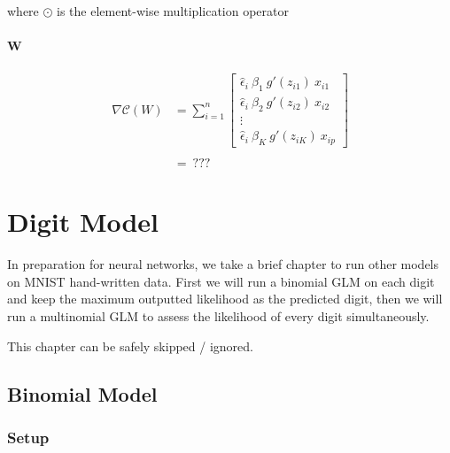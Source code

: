 \documentclass[
]{book}
\begin{document}
where \(\odot\) is the element-wise multiplication operator

\hypertarget{w}{%
\subsubsection{W}\label{w}}

\[
\begin{aligned}
\nabla \mathcal{C}(W) &= \sum_{i = 1}^n 
\begin{bmatrix}
\hat \epsilon_i\ \beta_1 \ g'(z_{i1}) \ x_{i1}  \\
\hat \epsilon_i\ \beta_2 \ g'(z_{i2}) \ x_{i2} \\
\vdots \\
\hat \epsilon_i\ \beta_K \ g'(z_{iK}) \ x_{ip}
\end{bmatrix} \\ \\
&= \ ???
\end{aligned}
\]

\hypertarget{digit-model}{%
\chapter{Digit Model}\label{digit-model}}

In preparation for neural networks, we take a brief chapter to run other models on MNIST hand-written data. First we will run a binomial GLM on each digit and keep the maximum outputted likelihood as the predicted digit, then we will run a multinomial GLM to assess the likelihood of every digit simultaneously.

This chapter can be safely skipped / ignored.

\hypertarget{binomial-model}{%
\section{Binomial Model}\label{binomial-model}}

\hypertarget{setup-1}{%
\subsection{Setup}\label{setup-1}}
\end{document}

